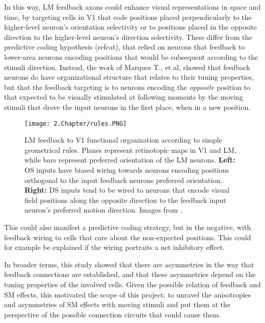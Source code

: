 In this way, LM feedback axons could enhance visual representations in space and time, by targeting cells in V1 that code positions placed perpendicularly to the higher-level neuron's orientation selectivity or to positions placed in the opposite direction to the higher-level neuron's direction selectivity. These differ from the predictive coding hypothesis (ref{cat}), that relied on neurons that feedback to lower-area neurons encoding positions that would be subsequent according to the stimuli direction. Instead, the work of Marques T., et al,  showed that feedback neurons do have organizational structure that relates to their tuning properties, but that the feedback targeting is to neurons encoding the \textit{opposite} position to that expected to be visually stimulated at following moments by the moving stimuli that drove the input neurons in the first place, when in a new position. 

\begin{figure}[H]
\center
\texttt{[image: 2.Chapter/rules.PNG]}
\caption{LM feedback to V1 functional organization according to simple geometrical rules. Planes represent retinotopic maps in V1 and LM, while bars represent preferred orientation of the LM neurons. \newline \textbf{Left:} OS inputs have biased wiring towards neurons encoding positions orthogonal to the input feedback neurons preferred orientation.
\newline \textbf{Right:} DS inputs tend to be wired to neurons that encode visual field positions along the opposite direction to the feedback input neuron's preferred motion direction.
\newline \newline \tiny{Images from \cite{Tiago}.}}
\label{rules}
\end{figure}

This could also manifest a predictive coding strategy, but in the negative, with feedback wiring to cells that care about the non-expected positions. This could for example be explained if the wiring portraits a net inhibitory effect.

In broader terms, this study showed that there are asymmetries in the way that feedback connections are established, and that these asymmetries depend on the tuning properties of the involved cells. 
Given the possible relation of feedback and SM effects, this motivated the scope of this project: to unravel the anisotropies and asymmetries of SM effects with moving stimuli and put them at the perspective of the possible connection circuits that could cause them.
